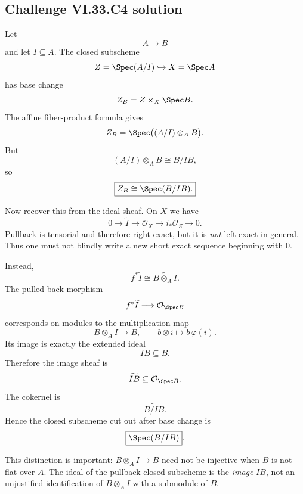 \subsection*{Challenge VI.33.C4 solution}
\begin{solution}
Let
\[
A\to B
\]
and let \(I\subseteq A\).  The closed subscheme
\[
Z=\Spec(A/I)
\hookrightarrow
X=\Spec A
\]
has base change
\[
Z_B
=
Z\times_X\Spec B.
\]
The affine fiber-product formula gives
\[
Z_B
=
\Spec\bigl((A/I)\otimes_A B\bigr).
\]
But
\[
(A/I)\otimes_A B
\cong
B/IB,
\]
so
\[
\boxed{
Z_B\cong\Spec(B/IB).
}
\]

Now recover this from the ideal sheaf.  On \(X\) we have
\[
0\to\widetilde I\to\mathcal O_X\to i_*\mathcal O_Z\to0.
\]
Pullback is tensorial and therefore right exact, but it is \emph{not} left exact in general.  Thus one must not
blindly write a new short exact sequence beginning with \(0\).

Instead,
\[
f^*\widetilde I
\cong
\widetilde{B\otimes_A I}.
\]
The pulled-back morphism
\[
f^*\widetilde I\longrightarrow\mathcal O_{\Spec B}
\]
corresponds on modules to the multiplication map
\[
B\otimes_A I\longrightarrow B,
\qquad
b\otimes i\longmapsto b\,\varphi(i).
\]
Its image is exactly the extended ideal
\[
IB\subseteq B.
\]
Therefore the image sheaf is
\[
\widetilde{IB}\subseteq\mathcal O_{\Spec B}.
\]
The cokernel is
\[
\widetilde{B/IB}.
\]
Hence the closed subscheme cut out after base change is
\[
\boxed{\Spec(B/IB)}.
\]

This distinction is important: \(B\otimes_A I\to B\) need not be injective when \(B\) is not flat over \(A\).
The ideal of the pullback closed subscheme is the \emph{image} \(IB\), not an unjustified identification of
\(B\otimes_A I\) with a submodule of \(B\).
\end{solution}

